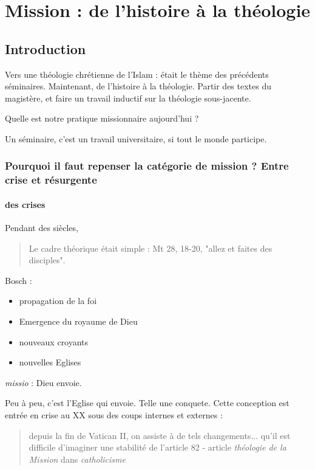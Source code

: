 \part{Mission : de l'histoire à la théologie}
\chapter{Introduction}


Vers une théologie chrétienne de l'Islam : était le thème des précédents séminaires.
Maintenant, de l'histoire à la théologie.
Partir des textes du magistère, et faire un travail inductif sur la théologie sous-jacente.
\begin{Synthesis}
Quelle est notre pratique missionnaire aujourd'hui ?
\end{Synthesis}

Un séminaire, c'est un travail universitaire, si tout le monde participe.

\section{Pourquoi il faut repenser la catégorie de mission ? Entre crise et résurgente}

\subsection{des crises}

Pendant des siècles, 
\begin{quote}
Le cadre théorique était simple : Mt 28, 18-20, "allez et faites des disciples". 
\end{quote}

Bosch : 
\begin{itemize}
\item propagation de la foi
\item Emergence du royaume de Dieu
\item nouveaux croyants
\item nouvelles Eglises
\end{itemize}

\begin{Def}[mission]
\textit{missio } : Dieu envoie.

\end{Def}
Peu à peu, c'est l'Eglise qui envoie. Telle une conquete. Cette conception est entrée en crise au XX sous des coups internes et externes : 
\begin{quote}
depuis la fin de Vatican II, on assiste à de tels changements... qu'il est difficile d'imaginer une stabilité de l'article
82 - article \textit{théologie de la Mission} dans \textit{catholicisme}
\end{quote}

